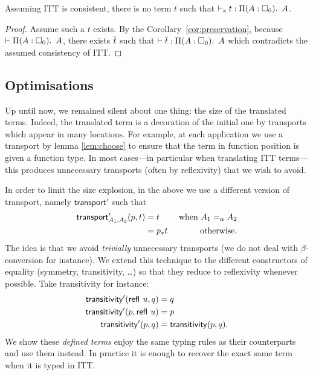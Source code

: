\begin{corollary}
  \label{cor:consistency}
  Assuming ITT is consistent, there is no term $t$ such that
  $\vdash_{\mathsf{x}} t : \mathop{\Pi(A:\square_{0}).\ }{A}$.
\end{corollary}

\begin{proof}
  Assume such a $t$ exists. By the Corollary~\ref{cor:preservation},
  because $\vdash \mathop{\Pi(A:\square_{0}).\ }{A}$,
  there exists $\overline{t}$ such that $\vdash \overline{t} : \mathop{\Pi(A:\square_{0}).\ }{A}$ which
  contradicts the assumed consistency of ITT.
\end{proof}

\subsection{Optimisations}
\label{sec:optim}

Up until now, we remained silent about one thing: the size of the
translated terms. Indeed, the translated term is a decoration of the
initial one by transports which appear in many locations. For example,
at each application we use a transport by lemma \ref{lem:choose} to
ensure that the term in function position is given a function type. In
most cases---in particular when translating ITT terms---this produces
unnecessary transports (often by reflexivity) that we wish to avoid.

In order to limit the size explosion, in the above we use a different version of
transport, namely $\mathsf{transport}'$ such that
%
\begin{align*}
  \mathsf{transport}'_{A_1,A_2}(p,t) &= t &\text{ when } A_1 =_\alpha A_2 \\
  &= p_*{t} &\text{ otherwise.}
\end{align*}
%
The idea is that we avoid \emph{trivially} unnecessary transports (we do not
deal with $\beta$-conversion for instance).
We extend this technique to the different constructors of equality (symmetry,
transitivity, \dots) so that they reduce to reflexivity whenever possible.
Take transitivity for instance:
%
\begin{align*}
  \mathsf{transitivity}'({\mathsf{refl}}_{}\  u,q) &= q \\
  \mathsf{transitivity}'(p,{\mathsf{refl}}_{}\  u) &= p \\
  \mathsf{transitivity}'(p,q) &= \mathsf{transitivity}(p,q).
\end{align*}
%
We show these \emph{defined terms} enjoy the same typing rules as their
counterparts and use them instead.
In practice it is enough to recover the exact same term when it is typed in ITT.

